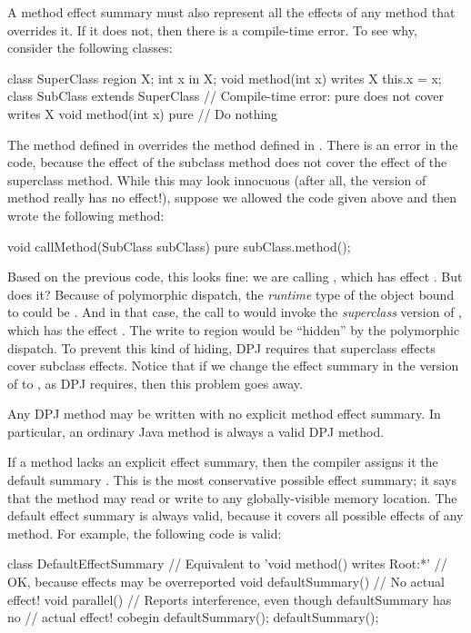 A method effect summary must also represent all the effects of any
method that overrides it.  If it does not, then there is a
compile-time error.  To see why, consider the following classes:
%
\begin{dpjlisting}
class SuperClass {
  region X;
  int x in X;
  void method(int x) 
    writes X 
  {
    this.x = x;
  }
}
class SubClass extends SuperClass {
  // Compile-time error:  pure does not cover writes X
  void method(int x) 
    pure 
  {
    // Do nothing
  }
}
\end{dpjlisting}
%
The method  defined in  overrides the method
 defined in .  There is an error in the
code, because the effect  of the subclass method does not
cover the effect  of the superclass method.  While this
may look innocuous (after all, the  version of method
really has no effect!), suppose we allowed the code given above and
then wrote the following method:
%
\begin{dpjlisting}
void callMethod(SubClass subClass) 
  pure 
{
  subClass.method();
}
\end{dpjlisting}
%
Based on the previous code, this looks fine: we are calling
, which has effect .  But does it?
Because of polymorphic dispatch, the \emph{runtime} type of the object
bound to  could be .  And in that case,
the call to  would invoke the \emph{superclass} version of
, which has the effect .  The write to
region  would be ``hidden'' by the polymorphic dispatch.  To
prevent this kind of hiding, DPJ requires that superclass effects
cover subclass effects.  Notice that if we change the effect summary
in the  version of  to , as
DPJ requires, then this problem goes away.

 Any DPJ method may be written with no
explicit method effect summary.  In particular, an ordinary Java
method is always a valid DPJ method.

If a method lacks an explicit effect summary, then the compiler
assigns it the default summary .  This is the most
conservative possible effect summary; it says that the method may read
or write to any globally-visible memory location.  The default effect
summary is always valid, because it covers all possible effects of any
method.  For example, the following code is valid:
%
\begin{dpjlisting}
class DefaultEffectSummary {
  // Equivalent to 'void method() writes Root:*'
  // OK, because effects may be overreported
  void defaultSummary() {
    // No actual effect!
  }
  void parallel() {
    // Reports interference, even though defaultSummary has no
    // actual effect!
    cobegin {
      defaultSummary();
      defaultSummary();
    }
  }
}
\end{dpjlisting}

